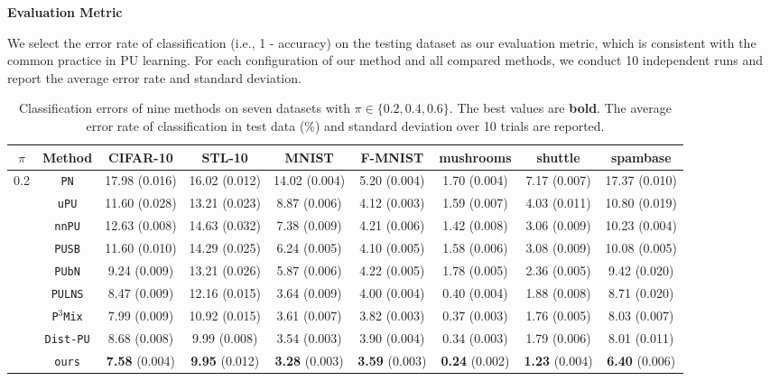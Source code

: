 \documentclass[sigconf]{acmart}
\begin{document}
\noindent\textbf{Evaluation Metric}

We select the error rate of classification (i.e., 1 - accuracy) on the testing dataset as our evaluation metric, which is consistent with the common practice in PU learning. For each configuration of our method and all compared methods, we conduct 10 independent runs and report the average error rate and standard deviation.


\begin{table*}[htbp]
    \caption{Classification errors of nine methods on seven datasets with $\pi\in\{0.2, 0.4, 0.6\}$. The best values are \textbf{bold}. The average error rate of classification in test data (\%) and standard deviation over 10 trials are reported.}
    \label{tab:all_res}
    \centering
    \begin{tabular}{ccccccccc} \toprule
        $\pi$ & Method & CIFAR-10 & STL-10 & MNIST & F-MNIST & mushrooms & shuttle & spambase\\
        \midrule
        \multirow{9}{*}{0.2} & \texttt{PN} & 17.98 (0.016) & 16.02 (0.012) & 14.02 (0.004) & 5.20 (0.004) & 1.70 (0.004) & 7.17 (0.007) & 17.37 (0.010)\\
        & \texttt{uPU} & 11.60 (0.028) & 13.21 (0.023) & 8.87 (0.006) & 4.12 (0.003) & 1.59 (0.007) & 4.03 (0.011) & 10.80 (0.019)\\
        & \texttt{nnPU} & 12.63 (0.008) & 14.63 (0.032) & 7.38 (0.009) & 4.21 (0.006) & 1.42 (0.008) & 3.06 (0.009) & 10.23 (0.004)\\
        & \texttt{PUSB} & 11.60 (0.010) & 14.29 (0.025) & 6.24 (0.005) & 4.10 (0.005) & 1.58 (0.006) & 3.08 (0.009) & 10.08 (0.005)\\
        & \texttt{PUbN} & 9.24 (0.009) & 13.21 (0.026) & 5.87 (0.006) & 4.22 (0.005) & 1.78 (0.005) & 2.36 (0.005) & 9.42 (0.020)\\
        & \texttt{PULNS} & 8.47 (0.009) & 12.16 (0.015) & 3.64 (0.009) & 4.00 (0.004) & 0.40 (0.004) & 1.88 (0.008) & 8.71 (0.020)\\
        & \texttt{P$^3$Mix} & 7.99 (0.009) & 10.92 (0.015) & 3.61 (0.007) & 3.82 (0.003) & 0.37 (0.003) & 1.76 (0.005) & 8.03 (0.007)\\
        & \texttt{Dist-PU} & 8.68 (0.008) & 9.99 (0.008) & 3.54 (0.003) & 3.90 (0.004) & 0.34 (0.003) & 1.79 (0.006) & 8.01 (0.011)\\
        & \texttt{ours} & \textbf{7.58} (0.004) & \textbf{9.95} (0.012) & \textbf{3.28} (0.003) & \textbf{3.59} (0.003) & \textbf{0.24} (0.002) & \textbf{1.23} (0.004) & \textbf{6.40} (0.006)\\

\end{tabular}
\end{table*}
\end{document}
